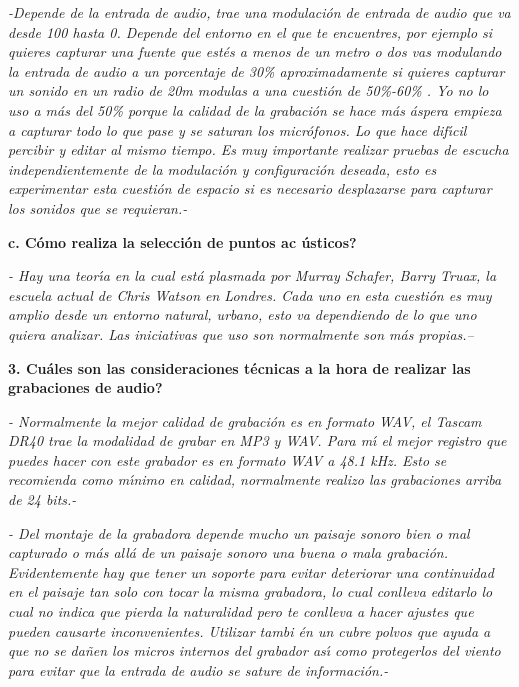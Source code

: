 \textit{-Depende de la entrada de audio, trae una modulaci\'{o}n de entrada
de audio que va desde 100 hasta 0. Depende del entorno en el que te
encuentres, por ejemplo si quieres capturar una fuente que est\'{e}s a menos
de un metro o dos vas modulando la entrada de audio a un porcentaje de 30\%
aproximadamente si quieres capturar un sonido en un radio de 20m modulas a
una cuesti\'{o}n de 50\%-60\% . Yo no lo uso a m\'{a}s del 50\% porque la
calidad de la grabaci\'{o}n se hace m\'{a}s \'{a}spera empieza a capturar
todo lo que pase y se saturan los micr\'{o}fonos. Lo que hace dif\'{\i}cil
percibir y editar al mismo tiempo. Es muy importante realizar pruebas de
escucha independientemente de la modulaci\'{o}n y configuraci\'{o}n deseada,
esto es experimentar esta cuesti\'{o}n de espacio si es necesario
desplazarse para capturar los sonidos que se requieran.-}

\textbf{c. \textquestiondown C\'{o}mo realiza la selecci\'{o}n de puntos ac%
\'{u}sticos? }

\textit{- Hay una teor\'{\i}a en la cual est\'{a} plasmada por Murray
Schafer, Barry Truax, la escuela actual de Chris Watson en Londres. Cada uno
en esta cuesti\'{o}n es muy amplio desde un entorno natural, urbano, esto va
dependiendo de lo que uno quiera analizar. Las iniciativas que uso son
normalmente son m\'{a}s propias.-- }

\textbf{3. \textquestiondown Cu\'{a}les son las consideraciones t\'{e}cnicas
a la hora de realizar las grabaciones de audio? }

\qquad \textit{- Normalmente la mejor calidad de grabaci\'{o}n es en formato
WAV, el Tascam DR40 trae la modalidad de grabar en MP3 y WAV. Para m\'{\i}
el mejor registro que puedes hacer con este grabador es en formato WAV a
48.1 kHz. Esto se recomienda como m\'{\i}nimo en calidad, normalmente
realizo las grabaciones arriba de 24 bits.- }

\textit{- Del montaje de la grabadora depende mucho un paisaje sonoro bien o
mal capturado o m\'{a}s all\'{a} de un paisaje sonoro una buena o mala
grabaci\'{o}n. Evidentemente hay que tener un soporte para evitar deteriorar
una continuidad en el paisaje tan solo con tocar la misma grabadora, lo cual
conlleva editarlo lo cual no indica que pierda la naturalidad pero te
conlleva a hacer ajustes que pueden causarte inconvenientes. Utilizar tambi%
\'{e}n un cubre polvos que ayuda a que no se da\~{n}en los micros internos
del grabador as\'{\i} como protegerlos del viento para evitar que la entrada
de audio se sature de informaci\'{o}n.-}

